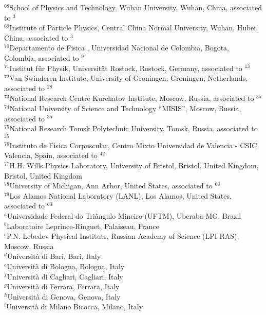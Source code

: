 \begin{flushleft}
{$ ^{68}$School of Physics and Technology, Wuhan University, Wuhan, China, associated to $^{3}$\\
$ ^{69}$Institute of Particle Physics, Central China Normal University, Wuhan, Hubei, China, associated to $^{3}$\\
$ ^{70}$Departamento de Fisica , Universidad Nacional de Colombia, Bogota, Colombia, associated to $^{9}$\\
$ ^{71}$Institut f{\"u}r Physik, Universit{\"a}t Rostock, Rostock, Germany, associated to $^{13}$\\
$ ^{72}$Van Swinderen Institute, University of Groningen, Groningen, Netherlands, associated to $^{28}$\\
$ ^{73}$National Research Centre Kurchatov Institute, Moscow, Russia, associated to $^{35}$\\
$ ^{74}$National University of Science and Technology ``MISIS'', Moscow, Russia, associated to $^{35}$\\
$ ^{75}$National Research Tomsk Polytechnic University, Tomsk, Russia, associated to $^{35}$\\
$ ^{76}$Instituto de Fisica Corpuscular, Centro Mixto Universidad de Valencia - CSIC, Valencia, Spain, associated to $^{42}$\\
$ ^{77}$H.H. Wills Physics Laboratory, University of Bristol, Bristol, United Kingdom, Bristol, United Kingdom\\
$ ^{78}$University of Michigan, Ann Arbor, United States, associated to $^{63}$\\
$ ^{79}$Los Alamos National Laboratory (LANL), Los Alamos, United States, associated to $^{63}$\\
\bigskip
$ ^{a}$Universidade Federal do Tri{\^a}ngulo Mineiro (UFTM), Uberaba-MG, Brazil\\
$ ^{b}$Laboratoire Leprince-Ringuet, Palaiseau, France\\
$ ^{c}$P.N. Lebedev Physical Institute, Russian Academy of Science (LPI RAS), Moscow, Russia\\
$ ^{d}$Universit{\`a} di Bari, Bari, Italy\\
$ ^{e}$Universit{\`a} di Bologna, Bologna, Italy\\
$ ^{f}$Universit{\`a} di Cagliari, Cagliari, Italy\\
$ ^{g}$Universit{\`a} di Ferrara, Ferrara, Italy\\
$ ^{h}$Universit{\`a} di Genova, Genova, Italy\\
$ ^{i}$Universit{\`a} di Milano Bicocca, Milano, Italy\\
}
\end{flushleft}
